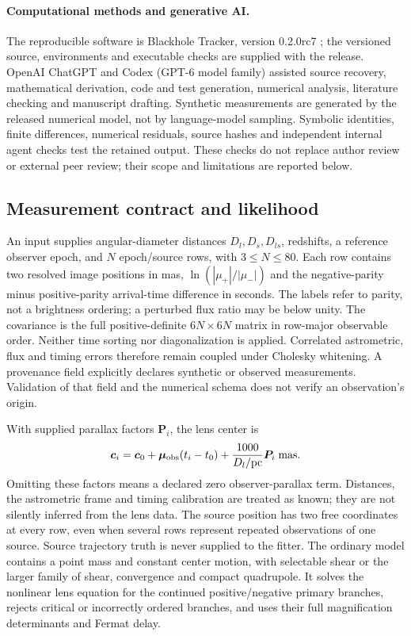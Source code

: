 \paragraph{Computational methods and generative AI.}
The reproducible software is Blackhole Tracker, version 0.2.0rc7
\cite{CarberryTrackerRC72026};
the versioned source, environments and executable checks are supplied
with the release. OpenAI ChatGPT and Codex (GPT-6 model family) assisted
source recovery, mathematical derivation, code and test generation,
numerical analysis, literature checking and manuscript drafting.
Synthetic measurements are generated by the released numerical model,
not by language-model sampling. Symbolic identities, finite differences,
numerical residuals, source hashes and independent internal agent checks
test the retained output. These checks do not replace author review or
external peer review; their scope and limitations are reported below.

\subsection{Measurement contract and likelihood}
An input supplies angular-diameter distances $D_l,D_s,D_{ls}$, redshifts,
a reference observer epoch, and $N$ epoch/source rows, with $3\le N\le80$.
Each row contains two resolved image positions in mas,
$\ln(|\mu_+|/|\mu_-|)$ and the negative-parity minus positive-parity
arrival-time difference in seconds. The labels refer to parity, not a
brightness ordering; a perturbed flux ratio may be below unity.
The covariance is the full positive-definite $6N\times6N$ matrix in
row-major observable order. Neither time sorting nor diagonalization is
applied. Correlated astrometric, flux and timing errors therefore remain
coupled under Cholesky whitening. A provenance field explicitly declares
synthetic or observed measurements. Validation of that field and the
numerical schema does not verify an observation's origin.

With supplied parallax factors $\boldsymbol P_i$, the lens center is
\begin{equation}
 \boldsymbol c_i=\boldsymbol c_0+
 \boldsymbol\mu_{\rm obs}(t_i-t_0)
 +\frac{1000}{D_l/\mathrm{pc}}\boldsymbol P_i\;\mathrm{mas}.
 \label{eq:product-track}
\end{equation}
Omitting these factors means a declared zero observer-parallax term.
Distances, the astrometric frame and timing calibration are treated as
known; they are not silently inferred from the lens data. The source
position has two free coordinates at every row, even when several rows
represent repeated observations of one source. Source trajectory truth
is never supplied to the fitter. The ordinary model contains a point
mass and constant center motion, with selectable shear or the larger
family of shear, convergence and compact quadrupole. It solves the
nonlinear lens equation for the continued positive/negative primary
branches, rejects critical or incorrectly ordered branches, and uses
their full magnification determinants and Fermat delay.

